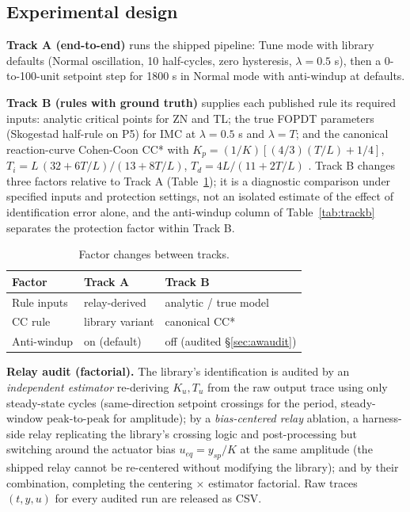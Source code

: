 \documentclass[10pt,twocolumn]{article}
\begin{document}
\subsection{Experimental design}

\textbf{Track A (end-to-end)} runs the shipped pipeline: Tune mode with library defaults (Normal oscillation, 10 half-cycles, zero hysteresis, $\lambda = 0.5$ s), then a 0-to-100-unit setpoint step for 1800 s in Normal mode with anti-windup at defaults.

\textbf{Track B (rules with ground truth)} supplies each published rule its required inputs: analytic critical points for ZN and TL; the true FOPDT parameters (Skogestad half-rule on P5) for IMC at $\lambda = 0.5$ s and $\lambda = T$; and the canonical reaction-curve Cohen-Coon CC* with $K_p = (1/K)[(4/3)(T/L) + 1/4]$, $T_i = L\,(32 + 6T/L)/(13 + 8T/L)$, $T_d = 4L/(11 + 2T/L)$ \cite{cohen1953}. Track B changes three factors relative to Track A (Table~\ref{tab:factors}); it is a diagnostic comparison under specified inputs and protection settings, not an isolated estimate of the effect of identification error alone, and the anti-windup column of Table~\ref{tab:trackb} separates the protection factor within Track B.

\begin{table}[t]
\centering
\caption{Factor changes between tracks.}
\label{tab:factors}
\small
\begin{tabular}{@{}lll@{}}
\toprule
Factor & Track A & Track B \\
\midrule
Rule inputs & relay-derived & analytic / true model \\
CC rule & library variant & canonical CC* \\
Anti-windup & on (default) & off (audited \S\ref{sec:awaudit}) \\
\bottomrule
\end{tabular}
\end{table}

\textbf{Relay audit (factorial).} The library's identification is audited by an \emph{independent estimator} re-deriving $K_u, T_u$ from the raw output trace using only steady-state cycles (same-direction setpoint crossings for the period, steady-window peak-to-peak for amplitude); by a \emph{bias-centered relay} ablation, a harness-side relay replicating the library's crossing logic and post-processing but switching around the actuator bias $u_{eq} = y_{sp}/K$ at the same amplitude (the shipped relay cannot be re-centered without modifying the library); and by their combination, completing the centering $\times$ estimator factorial. Raw traces $(t, y, u)$ for every audited run are released as CSV.
\end{document}
